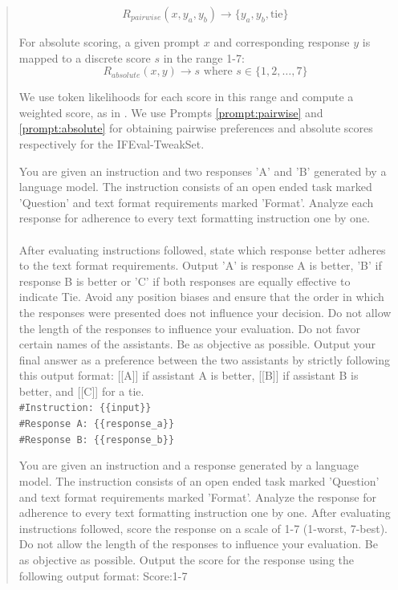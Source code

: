\documentclass{article}
\begin{document}
\begin{abstract}
\[
R_{pairwise}(x, y_a, y_b) \rightarrow \{y_a, y_b, \text{tie}\}
\]

For absolute scoring, a given prompt \(x\) and corresponding response \(y\) is mapped to a discrete score \(s\) in the range 1-7:
\[
R_{absolute}(x, y) \rightarrow s \text{ where } s \in \{1, 2, \dots, 7\}
\]

We use token likelihoods for each score in this range and compute a weighted score, as in \citep{lee2023rlaif}.  We use Prompts \ref{prompt:pairwise} and \ref{prompt:absolute} for obtaining pairwise preferences and absolute scores respectively for the IFEval-TweakSet. 


\begin{prompt}[title={\footnotesize\texttt{Prompt 1: Pairwise Preferences Evaluation}}, label=prompt:pairwise]
You are given an instruction and two responses 'A' and 'B' generated by a language model. The instruction consists of an open ended task marked 'Question' and text format requirements marked 'Format'. Analyze each response for adherence to every text formatting instruction one by one. \\ \\
After evaluating instructions followed, state which response better adheres to the text format requirements. Output 'A' is response A is better, 'B' if response B is better or 'C' if both responses are equally effective to indicate Tie. Avoid any position biases and ensure that the order in which the responses were presented does not influence your decision. Do not allow the length of the responses to influence your evaluation. Do not favor certain names of the assistants. Be as objective as possible. Output your final answer as a preference between the two assistants by strictly following this output format: [[A]] if assistant A is better, [[B]] if assistant B is better, and [[C]] for a tie.
\\

\texttt{\#Instruction: \{\{input\}\}} \\
\texttt{\#Response A: \{\{response\_a\}\}} \\
\texttt{\#Response B: \{\{response\_b\}\}}
\end{prompt}

\begin{prompt}[title={\footnotesize\texttt{Prompt 2: Absolute Scores Evaluation}}, label=prompt:absolute]
You are given an instruction and a response generated by a language model. The instruction consists of an open ended task marked 'Question' and text format requirements marked 'Format'. Analyze the response for adherence to every text formatting instruction one by one. After evaluating instructions followed, score the response on a scale of 1-7 (1-worst, 7-best). Do not allow the length of the responses to influence your evaluation. Be as objective as possible. Output the score for the response using the following output format: Score:1-7
\\


\end{prompt}
\end{abstract}
\end{document}
